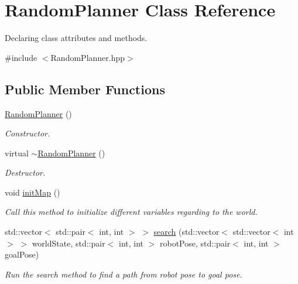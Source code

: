 \hypertarget{classRandomPlanner}{}\section{Random\+Planner Class Reference}
\label{classRandomPlanner}


Declaring class attributes and methods.  




{\ttfamily \#include $<$Random\+Planner.\+hpp$>$}

\subsection*{Public Member Functions}
\begin{DoxyCompactItemize}
\item 
\mbox{\label{classRandomPlanner_a9eb31cb3b21cd5e50fde093f7a25a768}} 
\mbox{\hyperlink{classRandomPlanner_a9eb31cb3b21cd5e50fde093f7a25a768}{Random\+Planner}} ()
\begin{DoxyCompactList}\small\item\em Constructor. \end{DoxyCompactList}\item 
\mbox{\label{classRandomPlanner_ac6fbd37adee0015e88b94725e1479e0c}} 
virtual \mbox{\hyperlink{classRandomPlanner_ac6fbd37adee0015e88b94725e1479e0c}{$\sim$\+Random\+Planner}} ()
\begin{DoxyCompactList}\small\item\em Destructor. \end{DoxyCompactList}\item 
void \mbox{\hyperlink{classRandomPlanner_ac912ac25d980a4ca2686fa954fed9669}{init\+Map}} ()
\begin{DoxyCompactList}\small\item\em Call this method to initialize different variables regarding to the world. \end{DoxyCompactList}\item 
std\+::vector$<$ std\+::pair$<$ int, int $>$ $>$ \mbox{\hyperlink{classRandomPlanner_afb0963c3771cb9a349a1cdb85ca7d379}{search}} (std\+::vector$<$ std\+::vector$<$ int $>$ $>$ world\+State, std\+::pair$<$ int, int $>$ robot\+Pose, std\+::pair$<$ int, int $>$ goal\+Pose)
\begin{DoxyCompactList}\small\item\em Run the search method to find a path from robot pose to goal pose. \end{DoxyCompactList}\end{DoxyCompactItemize}

